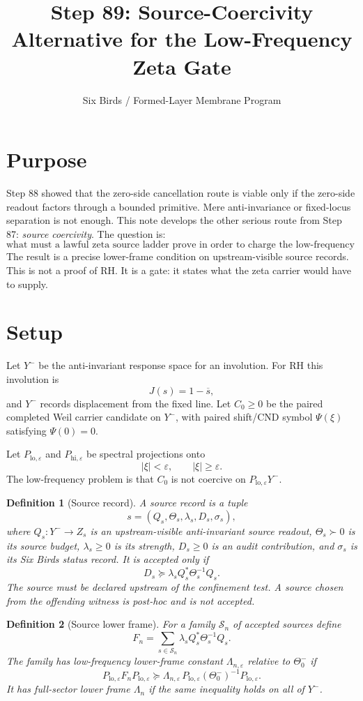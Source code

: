 \documentclass[11pt]{article}
\title{Step 89: Source-Coercivity Alternative for the Low-Frequency Zeta Gate}
\author{Six Birds / Formed-Layer Membrane Program}
\date{}
\newtheorem{definition}{Definition}
\begin{document}
\maketitle

\section{Purpose}
Step 88 showed that the zero-side cancellation route is viable only if the zero-side readout factors through a bounded primitive.  Mere anti-invariance or fixed-locus separation is not enough.  This note develops the other serious route from Step 87: \emph{source coercivity}.  The question is:
\[
\text{what must a lawful zeta source ladder prove in order to charge the low-frequency legal zero of the paired Weil carrier?}
\]
The result is a precise lower-frame condition on upstream-visible source records.  This is not a proof of RH.  It is a gate: it states what the zeta carrier would have to supply.

\section{Setup}
Let $Y^-$ be the anti-invariant response space for an involution.  For RH this involution is
\[
J(s)=1-\overline{s},
\]
and $Y^-$ records displacement from the fixed line.  Let $C_0\ge 0$ be the paired completed Weil carrier candidate on $Y^-$, with paired shift/CND symbol $\Psi(\xi)$ satisfying $\Psi(0)=0$.

Let $P_{\mathrm{lo},\varepsilon}$ and $P_{\mathrm{hi},\varepsilon}$ be spectral projections onto
\[
|\xi|<\varepsilon,\qquad |\xi|\ge \varepsilon.
\]
The low-frequency problem is that $C_0$ is not coercive on $P_{\mathrm{lo},\varepsilon}Y^-$.

\begin{definition}[Source record]
A source record is a tuple
\[
s=(Q_s,\Theta_s,\lambda_s,D_s,\sigma_s),
\]
where $Q_s:Y^-\to Z_s$ is an upstream-visible anti-invariant source readout, $\Theta_s\succ0$ is its source budget, $\lambda_s\ge0$ is its strength, $D_s\ge0$ is an audit contribution, and $\sigma_s$ is its Six Birds status record.  It is accepted only if
\[
D_s\succeq \lambda_s Q_s^*\Theta_s^{-1}Q_s.
\]
The source must be declared upstream of the confinement test.  A source chosen from the offending witness is post-hoc and is not accepted.
\end{definition}

\begin{definition}[Source lower frame]
For a family $\mathcal S_n$ of accepted sources define
\[
F_n=\sum_{s\in\mathcal S_n}\lambda_s Q_s^*\Theta_s^{-1}Q_s.
\]
The family has low-frequency lower-frame constant $\Lambda_{n,\varepsilon}$ relative to $\Theta_0^-$ if
\[
P_{\mathrm{lo},\varepsilon}F_nP_{\mathrm{lo},\varepsilon}
\succeq
\Lambda_{n,\varepsilon}\,P_{\mathrm{lo},\varepsilon}(\Theta_0^-)^{-1}P_{\mathrm{lo},\varepsilon}.
\]
It has full-sector lower frame $\Lambda_n$ if the same inequality holds on all of $Y^-$.
\end{definition}
\end{document}
